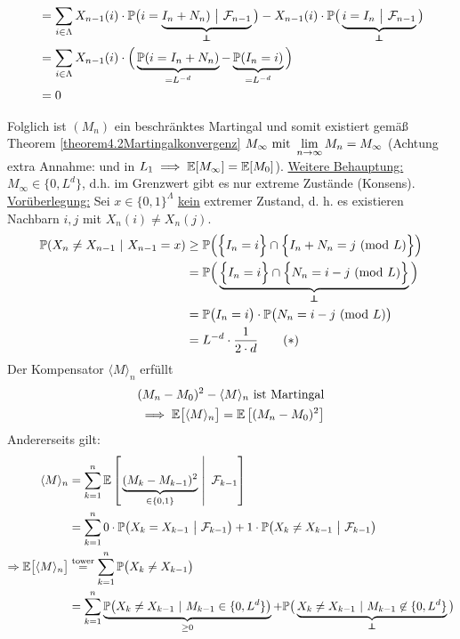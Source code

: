 \begin{beisp}[Wählermodell]
\begin{itemize}
\begin{align*}
&=\sum\limits_{i\in\Lambda} X_{n-1}(i)\cdot\P\big(i=\underbrace{I_n+N_n)~\big|~\F_{n-1}}_{\unab}\big)-X_{n-1}(i)\cdot\P\big(\underbrace{i=I_n~\big|~\F_{n-1}}_{\unab}\big)\\
&=\sum\limits_{i\in\Lambda} X_{n-1}(i)\cdot\Big(\underbrace{\P(i=I_n+N_n)}_{=L^{-d}}-\underbrace{\P(I_n=i)}_{=L^{-d}}\Big)\\
&=0
\end{align*}
\end{itemize}
Folglich ist $(M_n)$ ein beschränktes Martingal und somit existiert gemäß Theorem \ref{theorem4.2Martingalkonvergenz} $M_\infty\text{ mit }\lim\limits_{n\to\infty} M_n=M_\infty$ (Achtung extra Annahme: und in $L_1\implies\mathbb{E}[M_\infty]=\mathbb{E}[M_0]$).\nl
\ul{Weitere Behauptung:} $M_\infty\in\lbrace 0,L^d\rbrace$, d.h. im Grenzwert gibt es nur extreme Zustände (Konsens).\nl
\ul{Vorüberlegung:} Sei $x\in\lbrace0,1\rbrace^{\Lambda}$ \ul{kein} extremer Zustand, d. h. es existieren Nachbarn $i,j$ mit $X_n(i)\neq X_n(j)$.
\begin{align}
\P(X_n\neq X_{n-1}~|~X_{n-1}=x)\nonumber
&\geq \P\Big(\Big\lbrace I_n=i\Big\rbrace \cap \Big\lbrace I_n+N_n=j~(\text{mod } L)\Big\rbrace\Big)\\
&=\P\Big(\underbrace{\Big\lbrace I_n=i\Big\rbrace \cap\Big\lbrace N_n=i-j~(\text{mod  }L)\Big\rbrace}_{\unab}\Big)\nonumber\\
&=\P\big(I_n=i\big)\cdot\P\big(N_n=i-j~(\text{mod  }L)\big)\nonumber\\
&=L^{-d}\cdot\frac{1}{2\cdot d}\label{eqExampleWaehlermodellStern}\tag{$\ast$}
\end{align}
Der Kompensator $\langle M\rangle_n$ erfüllt
\begin{align*}
(M_n-M_0)^2-\langle M\rangle_n\text{ ist Martingal}\\
\implies
\mathbb{E}\big[\langle M\rangle_n\big]=\mathbb{E}\left[(M_n-M_0)^2\right]
\end{align*}
Andererseits gilt:
\begin{align*}
\langle M\rangle_n 
&=\sum\limits_{k=1}^n\E\left[\left.\underbrace{(M_k-M_{k-1})^2}_{\in\lbrace0,1\rbrace}~\right|~\F_{k-1}\right]\\
&=\sum\limits_{k=1}^n0 \cdot \P\big(X_k= X_{k-1}~\big|~\F_{k-1}\big)+ 1 \cdot \P\big(X_k\neq X_{k-1}~\big|~\F_{k-1}\big)\\
\Rightarrow
\E\big[\langle M\rangle_n\big]
&\stackeq{\text{tower}}\sum\limits_{k=1}^n\P\big(X_k\neq X_{k-1}\big)\\
&=\sum\limits_{k=1}^n\underbrace{\P\big(X_k\neq X_{k-1}~|~ M_{k-1} \in \{0,L^d\}\big)}_{\geq 0} + \P\big(\underbrace{X_k\neq X_{k-1}~|~ M_{k-1} \not\in \{0,L^d\}}_{\unab}\big)\\

\end{align*}
\end{beisp}
